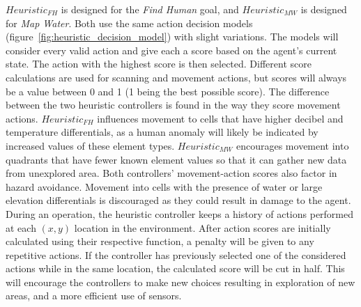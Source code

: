 \noindent
$Heuristic_{FH}$ is designed for the \textit{Find Human} goal, and $Heuristic_{MW}$ is designed for \textit{Map Water}.
Both use the same action decision models (figure~\ref{fig:heuristic_decision_model}) with slight variations.
The models will consider every valid action and give each a score based on the agent's current state.
The action with the highest score is then selected.
Different score calculations are used for scanning and movement actions, but scores will always be a value between 0 and 1 (1 being the best possible score).
The difference between the two heuristic controllers is found in the way they score movement actions.
$Heuristic_{FH}$ influences movement to cells that have higher decibel and temperature differentials, as a human anomaly will likely be indicated by increased values of these element types.
$Heuristic_{MW}$ encourages movement into quadrants that have fewer known element values so that it can gather new data from unexplored area.
Both controllers' movement-action scores also factor in hazard avoidance.
Movement into cells with the presence of water or large elevation differentials is discouraged as they could result in damage to the agent.
During an operation, the heuristic controller keeps a history of actions performed at each $(x,y)$ location in the environment.
After action scores are initially calculated using their respective function, a penalty will be given to any repetitive actions.
If the controller has previously selected one of the considered actions while in the same location, the calculated score will be cut in half.
This will encourage the controllers to make new choices resulting in exploration of new areas, and a more efficient use of sensors.

